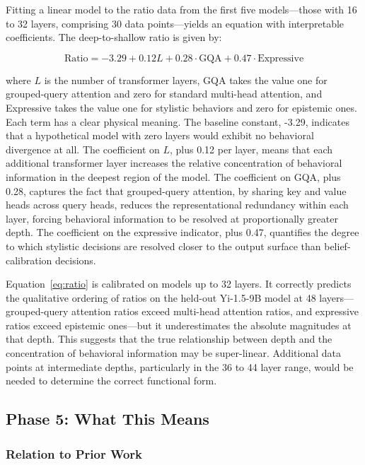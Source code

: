 \documentclass[11pt,a4paper]{article}
\begin{document}
Fitting a linear model to the ratio data from the first five models---those with 16 to 32 layers, comprising 30 data points---yields an equation with interpretable coefficients. The deep-to-shallow ratio is given by:

\begin{equation}
\boxed{\text{Ratio} = -3.29 + 0.12L + 0.28\cdot\text{GQA} + 0.47\cdot\text{Expressive}}
\label{eq:ratio}
\end{equation}

where $L$ is the number of transformer layers, GQA takes the value one for grouped-query attention and zero for standard multi-head attention, and Expressive takes the value one for stylistic behaviors and zero for epistemic ones. Each term has a clear physical meaning. The baseline constant, -3.29, indicates that a hypothetical model with zero layers would exhibit no behavioral divergence at all. The coefficient on $L$, plus 0.12 per layer, means that each additional transformer layer increases the relative concentration of behavioral information in the deepest region of the model. The coefficient on GQA, plus 0.28, captures the fact that grouped-query attention, by sharing key and value heads across query heads, reduces the representational redundancy within each layer, forcing behavioral information to be resolved at proportionally greater depth. The coefficient on the expressive indicator, plus 0.47, quantifies the degree to which stylistic decisions are resolved closer to the output surface than belief-calibration decisions.

Equation~\ref{eq:ratio} is calibrated on models up to 32 layers. It correctly predicts the qualitative ordering of ratios on the held-out Yi-1.5-9B model at 48 layers---grouped-query attention ratios exceed multi-head attention ratios, and expressive ratios exceed epistemic ones---but it underestimates the absolute magnitudes at that depth. This suggests that the true relationship between depth and the concentration of behavioral information may be super-linear. Additional data points at intermediate depths, particularly in the 36 to 44 layer range, would be needed to determine the correct functional form.

\subsection{Phase 5: What This Means}

\subsubsection{Relation to Prior Work}
\end{document}

